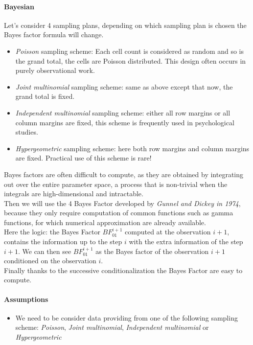 \paragraph{Bayesian}
Let's consider 4 sampling plans, depending on which sampling plan is chosen the Bayes
factor formula will change.
\begin{itemize}
    \item \emph{Poisson} sampling scheme: Each cell count is considered as random and so
        is the grand total, the cells are Poisson distributed. This design often occurs
        in purely observational work.
    \item \emph{Joint multinomial} sampling scheme: same as above except that now, the 
        grand total is fixed. 
    \item \emph{Independent multinomial} sampling scheme: either all row margins or all 
        column margins are fixed, this scheme is frequently used in psychological studies.
    \item \emph{Hypergeometric} sampling scheme: here both row margins and column margins are fixed. Practical use of this scheme is rare!  
\end{itemize}
Bayes factors are often difficult to compute, as they are obtained by integrating out over
the entire parameter space, a process that is non-trivial when the integrals are 
high-dimensional and intractable. \\
Then we will use the 4 Bayes Factor developed by \emph{Gunnel and Dickey in 1974}, because
they only require computation of common functions such as gamma functions, for which 
numerical approximation are already available.\\
Here the logic: the Bayes Factor $BF^{i+1}_{01}$ computed at the observation $i+1$, 
contains the information up to the step $i$ with the extra information of the step $i+1$. 
We can then see $BF^{i+1}_{01}$ as the Bayes factor of the observation $i+1$ conditioned
on the observation $i$.\\
Finally thanks to the successive conditionalization the Bayes Factor are easy to compute.

\paragraph{Assumptions}
\begin{itemize}
    \item We need to be consider data providing from one of the following sampling scheme: \emph{Poisson}, \emph{Joint multinomial}, \emph{Independent multinomial} or 
        \emph{Hypergeometric}
\end{itemize}

